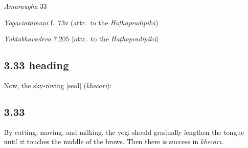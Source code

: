 \begin{ekdosis}
\begin{sources}[hp03_032]
\emph{Amaraugha} 33
\begin{versinnote}
\end{versinnote}
\end{sources}

\begin{testimonia}[hp03_032]
\emph{Yogacintāmaṇi} f.~73v (attr.~to the \emph{Haṭhapradīpikā})
\begin{versinnote}
\end{versinnote}

\emph{Yuktabhavadeva} 7.205 (attr.~to the \emph{Haṭhapradīpikā})
\begin{versinnote}
\end{versinnote}

\end{testimonia}


\subsection*{3.33 heading}
\begin{translation}[hp03_033a]
Now, the sky-roving [seal] (\emph{khecarī}):
\end{translation}


\subsection*{3.33}
\begin{translation}[hp03_033]
By cutting, moving, and milking, the yogi should gradually lengthen the tongue until it touches the middle of the brows. Then there is success in \emph{khecarī}.
\end{translation}


\end{ekdosis}
